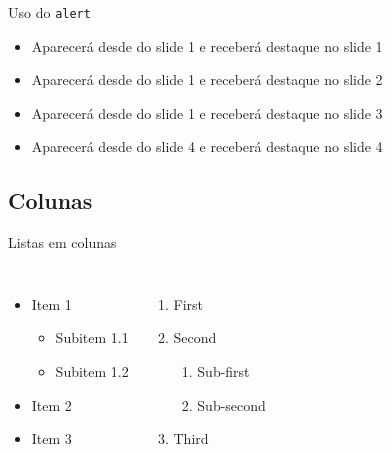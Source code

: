 \documentclass[aspectratio=169]{beamer}
\begin{document}
\begin{frame}{Uso do \texttt{alert}}
    \begin{itemize}
        \item<1-| alert@1> Aparecerá desde do slide 1 e receberá destaque no slide 1
        \item<1-| alert@2> Aparecerá desde do slide 1 e receberá destaque no slide 2
        \item<1-| alert@3> Aparecerá desde do slide 1 e receberá destaque no slide 3
        \item<4-| alert@4> Aparecerá desde do slide 4 e receberá destaque no slide 4
    \end{itemize} 
\end{frame}

\subsection{Colunas}

\begin{frame}{Listas em colunas}
    \begin{columns}[t, onlytextwidth]
            \begin{itemize}
                \item Item 1
                \begin{itemize}
                    \item Subitem 1.1
                    \item Subitem 1.2
                \end{itemize}
                \item Item 2
                \item Item 3
            \end{itemize}
        
            \begin{enumerate}
                \item First
                \item Second
                \begin{enumerate}
                    \item Sub-first
                    \item Sub-second
                \end{enumerate}
                \item Third
            \end{enumerate}
    \end{columns}
\end{frame}
\end{document}

